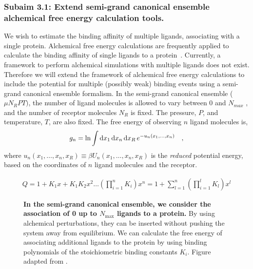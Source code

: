 \documentclass[10pt,final]{article}
\begin{document}
\subsubsection*{Subaim 3.1: Extend semi-grand canonical ensemble alchemical free energy calculation tools.}
We wish to estimate the binding affinity of multiple ligands, associating with a single protein.
%
Alchemical free energy calculations are frequently applied to calculate the binding affinity of single ligands to a protein~\autocite{Shirts2007a}. 
%
Currently, a framework to perform alchemical simulations with multiple ligands does not exist.
%
Therefore we will extend the framework of alchemical free energy calculations to include the potential for multiple (possibly weak) binding events using a semi-grand canonical ensemble formalism. 
%
In the semi-grand canonical ensemble ($\mu N_R PT)$, the number of ligand molecules is allowed to vary between 0 and $N_{max}$ , and the number of receptor molecules $N_R$ is fixed.
%
The pressure, $P$, and temperature, $T$, are also fixed. The free energy of observing $n$ ligand molecules is,
\begin{align}
 g_n = \ln \int \dif x_1 \dif x_n \dif x_R \, e^{-u_n(x_1,\dots,x_n)} \quad,
\end{align}
where  $u_n(x_1,\ldots,x_n,x_R) \equiv \beta U_n(x_1,\ldots,x_n,x_R)$ is the \emph{reduced} potential energy, based on the coordinates of $n$ ligand molecules and the receptor.

\begin{align}
 Q = 1 + K_1x + K_1K_2x^2 \dots \left(\prod\limits_{i=1}^{n} K_i\right) x^n = 1 + \sum\limits_{l=1}^n \left(\prod\limits_{i=1}^{l} K_l\right)x^l
\end{align}


\begin{figure}[H]
  \centering
  \caption{\textbf{In the semi-grand canonical ensemble, we consider the association of 0 up to $N_\mathrm{max}$ ligands to a protein. }By using alchemical perturbations, they can be inserted without pushing the system away from equilibrium. We can calculate the free energy of associating additional ligands to the protein by using binding polynomials of the stoichiometric binding constants $K_i$. Figure adapted from \textcite{Klotz1997a}. }
  \label{figure:semigrand}
\end{figure}
\end{document}
